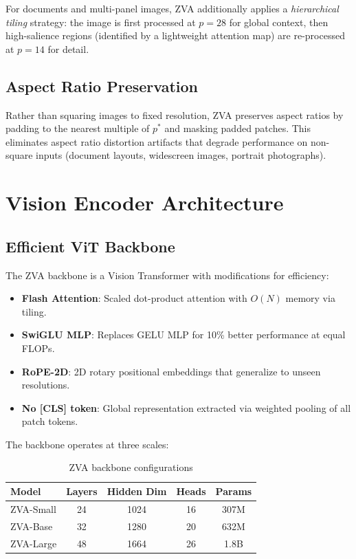 \documentclass[11pt,a4paper]{article}
\begin{document}
For documents and multi-panel images, ZVA additionally applies a \emph{hierarchical tiling} strategy: the image is first processed at $p=28$ for global context, then high-salience regions (identified by a lightweight attention map) are re-processed at $p=14$ for detail.

\subsection{Aspect Ratio Preservation}

Rather than squaring images to fixed resolution, ZVA preserves aspect ratios by padding to the nearest multiple of $p^*$ and masking padded patches. This eliminates aspect ratio distortion artifacts that degrade performance on non-square inputs (document layouts, widescreen images, portrait photographs).

\section{Vision Encoder Architecture}

\subsection{Efficient ViT Backbone}

The ZVA backbone is a Vision Transformer with modifications for efficiency:

\begin{itemize}
  \item \textbf{Flash Attention}: Scaled dot-product attention with $O(N)$ memory via tiling.
  \item \textbf{SwiGLU MLP}: Replaces GELU MLP for 10\% better performance at equal FLOPs.
  \item \textbf{RoPE-2D}: 2D rotary positional embeddings that generalize to unseen resolutions.
  \item \textbf{No [CLS] token}: Global representation extracted via weighted pooling of all patch tokens.
\end{itemize}

The backbone operates at three scales:

\begin{table}[H]
\centering
\caption{ZVA backbone configurations}
\label{tab:backbone}
\begin{tabular}{lcccc}
\toprule
Model & Layers & Hidden Dim & Heads & Params \\
\midrule
ZVA-Small & 24 & 1024 & 16 & 307M \\
ZVA-Base & 32 & 1280 & 20 & 632M \\
ZVA-Large & 48 & 1664 & 26 & 1.8B \\
\bottomrule
\end{tabular}
\end{table}
\end{document}
